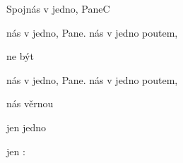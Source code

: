 \begin{song}{Spojnás v jedno, Pane}{C}{}
\begin{SBChorus*}
 nás v jedno, Pane.  nás v jedno poutem, 

 ne být  

 nás v jedno, Pane.   nás v jedno poutem, 

 nás věrnou   

 jen    jedno  

 jen    :
\end{SBChorus*}
\end{song}
\pagebreak
